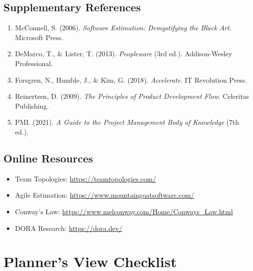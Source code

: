 \documentclass[11pt,letterpaper]{article}
\begin{document}
\subsection{Supplementary References}

\begin{enumerate}[resume]
    \item McConnell, S. (2006). \textit{Software Estimation: Demystifying the Black Art}. Microsoft Press.
    
    \item DeMarco, T., \& Lister, T. (2013). \textit{Peopleware} (3rd ed.). Addison-Wesley Professional.
    
    \item Forsgren, N., Humble, J., \& Kim, G. (2018). \textit{Accelerate}. IT Revolution Press.
    
    \item Reinertsen, D. (2009). \textit{The Principles of Product Development Flow}. Celeritas Publishing.
    
    \item PMI. (2021). \textit{A Guide to the Project Management Body of Knowledge} (7th ed.).
\end{enumerate}

\subsection{Online Resources}

\begin{itemize}
    \item Team Topologies: \url{https://teamtopologies.com/}
    \item Agile Estimation: \url{https://www.mountaingoatsoftware.com/}
    \item Conway's Law: \url{https://www.melconway.com/Home/Conways_Law.html}
    \item DORA Research: \url{https://dora.dev/}
\end{itemize}

\appendix

\section{Planner's View Checklist}
\end{document}
